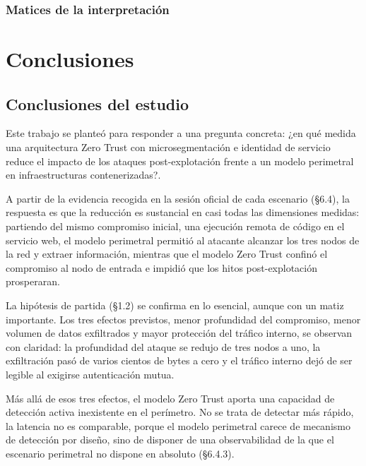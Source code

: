 \documentclass[11pt,spanish,listoffigures,listoftables]{tfgetsinf}
\begin{document}
        \subsection{Matices de la interpretación}


\chapter{Conclusiones}

        \section{Conclusiones del estudio}
        Este trabajo se planteó para responder a una pregunta concreta: ¿en qué medida una arquitectura Zero Trust con microsegmentación e identidad de servicio reduce el impacto de los ataques post-explotación frente a un modelo perimetral en infraestructuras contenerizadas?. 

        A partir de la evidencia recogida en la sesión oficial de cada escenario (§6.4), la respuesta es que la reducción es sustancial en casi todas las dimensiones medidas: partiendo del mismo compromiso inicial, una ejecución remota de código en el servicio web, el modelo perimetral permitió al atacante alcanzar los tres nodos de la red y extraer información, mientras que el modelo Zero Trust confinó el compromiso al nodo de entrada e impidió que los hitos post-explotación prosperaran.

        La hipótesis de partida (§1.2) se confirma en lo esencial, aunque con un matiz importante. Los tres efectos previstos, menor profundidad del compromiso, menor volumen de datos exfiltrados y mayor protección del tráfico interno, se observan con claridad: la profundidad del ataque se redujo de tres nodos a uno, la exfiltración pasó de varios cientos de bytes a cero y el tráfico interno dejó de ser legible al exigirse autenticación mutua.

        Más allá de esos tres efectos, el modelo Zero Trust aporta una capacidad de detección activa inexistente en el perímetro. No se trata de detectar más rápido, la latencia no es comparable, porque el modelo perimetral carece de mecanismo de detección por diseño, sino de disponer de una observabilidad de la que el escenario perimetral no dispone en absoluto (§6.4.3).
\end{document}
